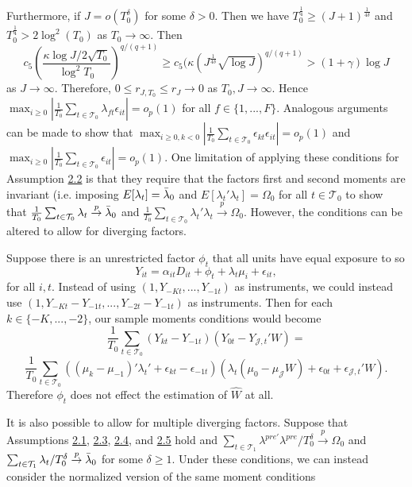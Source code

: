 \documentclass{article}
\begin{document}
Furthermore, if $J = o(T_0^\delta)$ for some $\delta > 0$. Then we have $T_0^{\frac{1}{4}} \geq (J+1)^{\frac{1}{4 \delta}}$ and $T_0^{\frac{1}{4}} > 2\log^2(T_0)$ as $T_0 \rightarrow \infty$. Then 
$$c_5 (\frac{\kappa \log J /2\sqrt{T_0}}{\log^2 T_0})^{q/(q+1)} \geq c_5 (\kappa(J^{\frac{1}{4\delta}} \sqrt{\log J})^{q/(q+1)} > (1 + \gamma) \log J$$
as $J \rightarrow \infty$. Therefore, $ 0 \leq r_{J,T_0} \leq r_J \rightarrow 0$ as $T_0,J \rightarrow \infty$. Hence $\max_{i \geq 0} |\frac{1}{T_0} \sum_{t \in \mathcal{T}_0} \lambda_{ft}\epsilon_{it}| = o_p(1)$ for all $f \in \{1,...,F\}$. Analogous arguments can be made to show that  $\max_{i \geq 0, k< 0} |\frac{1}{T_0} \sum_{t \in \mathcal{T}_0} \epsilon_{kt}\epsilon_{it}| = o_p(1)$ and $\max_{i \geq 0}|\frac{1}{T_0} \sum_{t \in \mathcal{T}_0} \epsilon_{it}| = o_p(1)$. One limitation of applying these conditions for Assumption \hyperref[A2]{2.2} is that they require that the factors first and second moments are invariant (i.e. imposing $E[\lambda_t] = \Bar{\lambda}_0$ and $E[\lambda_t'\lambda_t] = \Omega_0$ for all $t \in \mathcal{T}_0$ to show that $\frac{1}{T_0}\sum_{t \in \mathcal{T}_0}\lambda_t \overset{p}{\rightarrow} \Bar{\lambda}_0$ and $\frac{1}{T_0}\sum_{t \in \mathcal{T}_0}\lambda_t'\lambda_t \overset{p}{\rightarrow} \Omega_0$. However, the conditions can be altered to allow for diverging factors. 
\par 
Suppose there is an unrestricted factor $\phi_t$ that all units have equal exposure to so 
$$Y_{it} = \alpha_{it}D_{it} + \phi_t + \lambda_t \mu_i + \epsilon_{it},$$
for all $i,t$. Instead of using $(1, Y_{-Kt}, ..., Y_{-1t})$ as instruments, we could instead use $(1,Y_{-Kt}-Y_{-1t},...,Y_{-2t}-Y_{-1t})$ as instruments. Then for each $k \in \{-K,...,-2\}$, our sample moments conditions would become
$$\frac{1}{T_0}\sum_{t \in \mathcal{T}_0} (Y_{kt}-Y_{-1t})(Y_{0t} - Y_{\mathcal{J},t}'W) =$$
$$\frac{1}{T_0}\sum_{t \in \mathcal{T}_0}((\mu_k - \mu_{-1})'\lambda_t' + \epsilon_{kt} - \epsilon_{-1t})(\lambda_t(\mu_0 - \mu_{\mathcal{J}}W) + \epsilon_{0t} + \epsilon_{\mathcal{J},t}'W).$$
Therefore $\phi_t$ does not effect the estimation of $\hat{W}$ at all. 
\par 
It is also possible to allow for multiple diverging factors. Suppose that Assumptions \hyperref[A2]{2.1}, \hyperref[A2]{2.3}, \hyperref[A2]{2.4}, and \hyperref[A2]{2.5} hold and $\sum_{t \in \mathcal{T}_1} \lambda^{pre'}\lambda^{pre}/T_0^\delta \overset{p}{\rightarrow} \Omega_0$ and $\sum_{t \in \mathcal{T}_1} \lambda_t /T_0^\delta \overset{p}{\rightarrow} \Bar{\lambda}_0$ for some $\delta \geq 1$. Under these conditions, we can instead consider the normalized version of the same moment conditions
\end{document}
